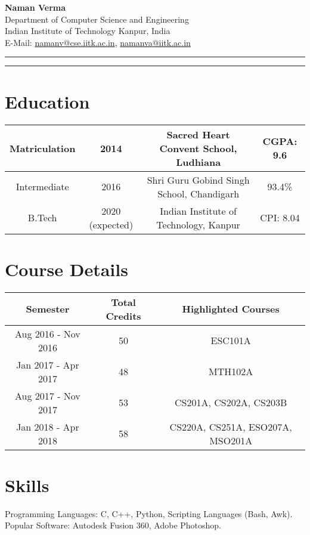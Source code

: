 \documentclass[a4paper, 10pt]{article}
\begin{document}
\noindent\textbf{Naman Verma}\\
Department of Computer Science and Engineering\\
Indian Institute of Technology Kanpur, India\\
E-Mail: \href{namanv@cse.iitk.ac.in}{namanv@cse.iitk.ac.in}, \href{namanva@iitk.ac.in}{namanva@iitk.ac.in}

\par\noindent\rule{\textwidth}{0.4pt}
\par\noindent\rule{\textwidth}{0.4pt}

\section*{Education}

\begin{tabular}{ |c|c|c|c| } 
    \hline
    Matriculation & 2014 & Sacred Heart Convent School, Ludhiana & CGPA: 9.6 \\
    \hline
    Intermediate & 2016 & Shri Guru Gobind Singh School, Chandigarh & 93.4\% \\ 
    \hline
    B.Tech & 2020 (expected) & Indian Institute of Technology, Kanpur & CPI: 8.04\\ 
    \hline
\end{tabular}

\section*{Course Details}

\begin{tabular}{ |c|c|c| } 
    \hline
    \textbf{Semester} & \textbf{Total Credits} & \textbf{Highlighted Courses} \\
    \hline
    Aug 2016 - Nov 2016 & 50 & ESC101A \\
    \hline
    Jan 2017 - Apr 2017 & 48 & MTH102A \\
    \hline
    Aug 2017 - Nov 2017 & 53 & CS201A, CS202A, CS203B \\
    \hline
    Jan 2018 - Apr 2018 & 58 & CS220A, CS251A, ESO207A, MSO201A\\
    \hline
\end{tabular}

\section*{Skills}

Programming Languages: C, C++, Python, Scripting Languages (Bash, Awk).\\
Popular Software: Autodesk Fusion 360, Adobe Photoshop.
\end{document}

